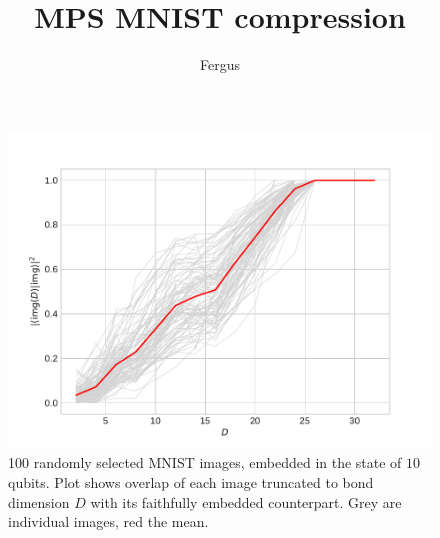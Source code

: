 \documentclass{tufte-handout}
\author{Fergus}
\title{MPS MNIST compression}
\begin{document}
    \maketitle
    \begin{figure}[h]
        \includegraphics[width=\linewidth]{overlaps.pdf}
        \caption{100 randomly selected MNIST images, embedded in the state of $10$ qubits. Plot shows overlap of each image truncated to bond dimension $D$ with its faithfully embedded counterpart. Grey are individual images, red the mean.}
    \end{figure}
\end{document}
